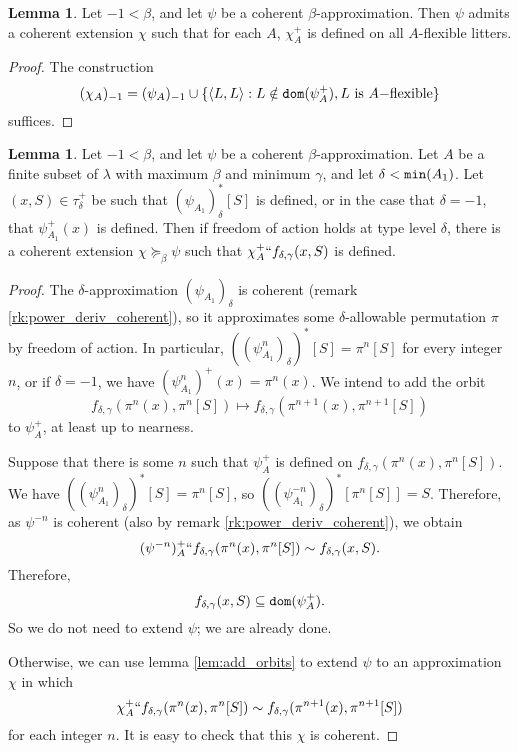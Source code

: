 \documentclass[112pt]{article}
\theoremstyle{definition}
\newtheorem{lemma}[theorem]{Lemma}
\theoremstyle{remark}
\begin{document}
\begin{lemma}\label{lem:foa_flexible}
  Let $-1 < \beta$, and let $\psi$ be a coherent $\beta$-approximation.
  Then $\psi$ admits a coherent extension $\chi$ such that for each $A$, $\chi_A^+$ is defined on all $A$-flexible litters.
\end{lemma}
\begin{proof}
  The construction
  $$ (\chi_A)_{-1} = (\psi_A)_{-1} \cup \{ \langle L, L \rangle : L \notin {\tt dom}(\psi_A^+), L\ \mathrm{is}\ A\mathrm{-flexible} \} $$
  suffices.
\end{proof}
\begin{lemma}\label{lem:foa_inflexible}
  Let $-1 < \beta$, and let $\psi$ be a coherent $\beta$-approximation.
  Let $A$ be a finite subset of $\lambda$ with maximum $\beta$ and minimum $\gamma$, and let $\delta < {\tt min}(A_1)$.
  Let $(x, S) \in \tau_\delta^+$ be such that $(\psi_{A_1})_\delta^*[S]$ is defined, or in the case that $\delta=-1$, that $\psi_{A_1}^+(x)$ is defined.
  Then if freedom of action holds at type level $\delta$, there is a coherent extension $\chi \succeq_\beta \psi$ such that $
  \chi_A^+ `` f_{\delta,\gamma}(x, S)$ is defined.
\end{lemma}
\begin{proof}
  The $\delta$-approximation $(\psi_{A_1})_\delta$ is coherent (remark \ref{rk:power_deriv_coherent}), so it approximates some $\delta$-allowable permutation $\pi$ by freedom of action.
  In particular, $((\psi_{A_1}^n)_\delta)^*[S] = \pi^n[S]$ for every integer $n$, or if $\delta=-1$, we have $(\psi_{A_1}^n)^+(x) = \pi^n(x)$.
  We intend to add the orbit
  $$ f_{\delta,\gamma}(\pi^n(x), \pi^n[S]) \mapsto f_{\delta,\gamma}(\pi^{n+1}(x), \pi^{n+1}[S]) $$
  to $\psi_A^+$, at least up to nearness.

  Suppose that there is some $n$ such that $\psi_A^+$ is defined on $f_{\delta,\gamma}(\pi^n(x), \pi^n[S])$.
  We have $((\psi_{A_1}^n)_\delta)^*[S] = \pi^n[S]$, so $((\psi_{A_1}^{-n})_\delta)^*[\pi^n[S]] = S$.
  Therefore, as $\psi^{-n}$ is coherent (also by remark \ref{rk:power_deriv_coherent}), we obtain
  $$ (\psi^{-n})_A^+ `` f_{\delta,\gamma}(\pi^n(x), \pi^n[S]) \sim f_{\delta,\gamma}(x, S). $$
  Therefore,
  $$ f_{\delta,\gamma}(x, S) \subseteq {\tt dom}(\psi_A^+).$$
  So we do not need to extend $\psi$; we are already done.

  Otherwise, we can use lemma \ref{lem:add_orbits} to extend $\psi$ to an approximation $\chi$ in which
  $$ \chi_A^+ `` f_{\delta,\gamma}(\pi^n(x), \pi^n[S]) \sim f_{\delta,\gamma}(\pi^{n+1}(x), \pi^{n+1}[S]) $$
  for each integer $n$.
  It is easy to check that this $\chi$ is coherent.
\end{proof}
\end{document}
